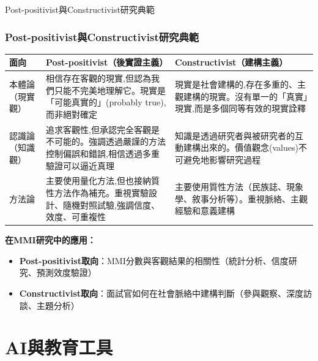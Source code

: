 \documentclass[aspectratio=169]{beamer}
\newcommand{\smalltablesize}{\fontsize{6.5pt}{8pt}\selectfont}
\begin{document}
\begin{frame}{Post-positivist與Constructivist研究典範}
\frametitle{Post-positivist與Constructivist研究典範}
\begin{table}[h]
\centering
\smalltablesize
\begin{tabular}{p{2.2cm}p{4.3cm}p{4.3cm}}
\toprule
\textbf{面向} & \textbf{Post-positivist（後實證主義）} & \textbf{Constructivist（建構主義）} \\
\midrule
本體論（現實觀） & 相信存在客觀的現實,但認為我們只能不完美地理解它。現實是「可能真實的」(probably true),而非絕對確定 & 現實是社會建構的,存在多重的、主觀建構的現實。沒有單一的「真實」現實,而是多個同等有效的現實詮釋 \\
\midrule
認識論（知識觀） & 追求客觀性,但承認完全客觀是不可能的。強調透過嚴謹的方法控制偏誤和錯誤,相信透過多重驗證可以逼近真理 & 知識是透過研究者與被研究者的互動建構出來的。價值觀念(values)不可避免地影響研究過程 \\
\midrule
方法論 & 主要使用量化方法,但也接納質性方法作為補充。重視實驗設計、隨機對照試驗,強調信度、效度、可重複性 & 主要使用質性方法（民族誌、現象學、敘事分析等）。重視脈絡、主觀經驗和意義建構 \\
\bottomrule
\end{tabular}
\end{table}

\vspace{0.3cm}

\textbf{在MMI研究中的應用：}
\begin{itemize}
    \item \textbf{Post-positivist取向}：MMI分數與客觀結果的相關性（統計分析、信度研究、預測效度驗證）
    \item \textbf{Constructivist取向}：面試官如何在社會脈絡中建構判斷（參與觀察、深度訪談、主題分析）
\end{itemize}
\end{frame}

\section{AI與教育工具}
\end{document}

